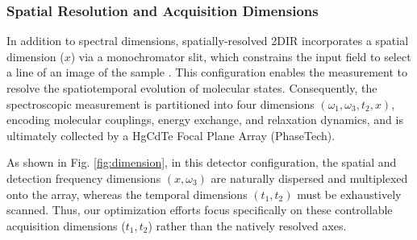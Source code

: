 \documentclass{optica-article}
\begin{document}
\subsubsection{Spatial Resolution and Acquisition Dimensions}

In addition to spectral dimensions, spatially-resolved 2DIR incorporates a spatial dimension ($x$) via a monochromator slit, which constrains the input field to select a line of an image of the sample \cite{yang2023enabling}. This configuration enables the measurement to resolve the spatiotemporal evolution of molecular states. Consequently, the spectroscopic measurement is partitioned into four dimensions $(\omega_1, \omega_3, t_2, x)$, encoding molecular couplings, energy exchange, and relaxation dynamics, and is ultimately collected by a HgCdTe Focal Plane Array (PhaseTech). 

As shown in Fig. \ref{fig:dimension}, in this detector configuration, the spatial and detection frequency dimensions $(x, \omega_3)$ are naturally dispersed and multiplexed onto the array, whereas the temporal dimensions $(t_1, t_2)$ must be exhaustively scanned. Thus, our optimization efforts focus specifically on these controllable acquisition dimensions ($t_1, t_2$) rather than the natively resolved axes.

\end{document}
